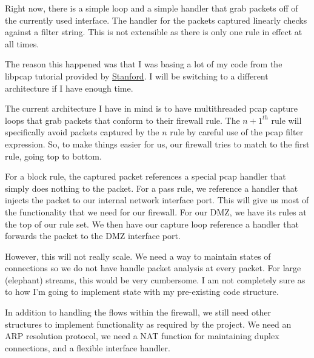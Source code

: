 \documentclass[12pt]{article}
\begin{document}
Right now, there is a simple loop and a simple handler that grab packets off
of the currently used interface. 
The handler for the packets captured linearly checks against a filter string.
This is not extensible as there is only one rule in effect at all times. \par

The reason this happened was that I was basing a lot of my code from the
libpcap tutorial provided by
\href{http://yuba.stanford.edu/~casado/pcap/section3.html}{Stanford}.
I will be switching to a different architecture if I have enough time. \par

The current architecture I have in mind is to have multithreaded pcap capture
loops that grab packets that conform to their firewall rule.
The $n+1^{th}$ rule will specifically avoid packets captured by the $n$ rule
by careful use of the pcap filter expression. 
So, to make things easier for us, our firewall tries to match to the first 
rule, going top to bottom. \par

For a block rule, the captured packet references a special pcap handler that
simply does nothing to the packet.
For a pass rule, we reference a handler that injects the packet to our internal
network interface port.
This will give us most of the functionality that we need for our firewall.
For our DMZ, we have its rules at the top of our rule set.
We then have our capture loop reference a handler that forwards the packet
to the DMZ interface port. \par

However, this will not really scale.
We need a way to maintain states of connections so we do not have handle packet
analysis at every packet.
For large (elephant) streams, this would be very cumbersome.
I am not completely sure as to how I'm going to implement state with my 
pre-existing code structure. \par

In addition to handling the flows within the firewall, we still need other
structures to implement functionality as required by the project.
We need an ARP resolution protocol,
we need a NAT function for maintaining duplex connections,
and a flexible interface handler. \par
\end{document}
